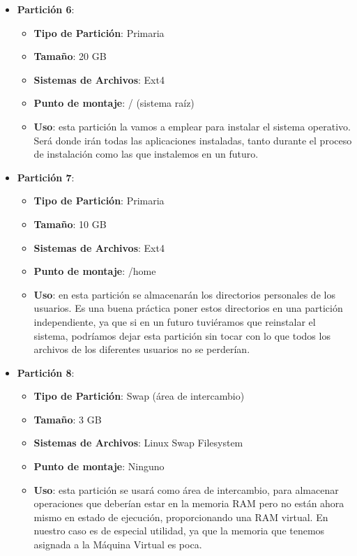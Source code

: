  \begin{itemize}
    \item \textbf{Partición 6}:
    \begin{itemize}
        \item \textbf{Tipo de Partición}: Primaria
        \item \textbf{Tamaño}: 20 GB
        \item \textbf{Sistemas de Archivos}: Ext4
        \item \textbf{Punto de montaje}: / (sistema raíz)
        \item \textbf{Uso}: esta partición la vamos a emplear para instalar el sistema operativo. Será donde irán todas las aplicaciones instaladas, tanto durante el proceso de instalación como las que instalemos en un futuro.
    \end{itemize}


    \item \textbf{Partición 7}:
    \begin{itemize}
        \item \textbf{Tipo de Partición}: Primaria
        \item \textbf{Tamaño}: 10 GB
        \item \textbf{Sistemas de Archivos}: Ext4
        \item \textbf{Punto de montaje}: /home
        \item \textbf{Uso}: en esta partición se almacenarán los directorios personales de los usuarios. Es una buena práctica poner estos directorios en una partición independiente, ya que si en un futuro tuviéramos que reinstalar el sistema, podríamos dejar esta partición sin tocar con lo que todos los archivos de los diferentes usuarios no se perderían.
    \end{itemize}

    \item \textbf{Partición 8}:
    \begin{itemize}
        \item \textbf{Tipo de Partición}: Swap (área de intercambio)
        \item \textbf{Tamaño}: 3 GB
        \item \textbf{Sistemas de Archivos}: Linux Swap Filesystem
        \item \textbf{Punto de montaje}: Ninguno
        \item \textbf{Uso}: esta partición se usará como área de intercambio, para almacenar operaciones que deberían estar en la memoria RAM pero no están ahora mismo en estado de ejecución, proporcionando una RAM virtual. En nuestro caso es de especial utilidad, ya que la memoria que tenemos asignada a la Máquina Virtual es poca.
    \end{itemize}


\end{itemize}



%
%

